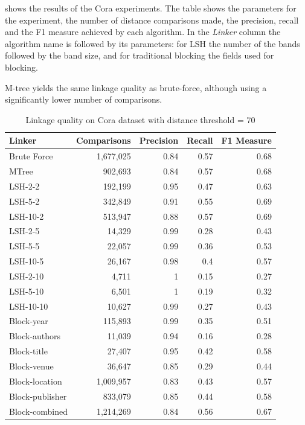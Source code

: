 \documentclass{llncs}
\begin{document}
 shows the results of the Cora
experiments. The table shows the parameters for the experiment, the
number of distance comparisons made, the precision, recall and the F1
measure achieved by each algorithm.  In the \emph{Linker} column the algorithm name is followed by its
parameters: for LSH the number of the bands followed by the band size, and for traditional blocking the fields used
for blocking.

M-tree yields the same linkage quality as brute-force, although using a significantly lower
number of comparisons.


\begin{table}[ht]
\centering
\begin{tabular}{l|r|r|r|r}
\parbox{0.2\textwidth}{\centering Linker} &
\parbox{0.2\textwidth}{\centering Comparisons} &
\parbox{0.17\textwidth}{\centering Precision} &
\parbox{0.17\textwidth}{\centering Recall} &
\parbox{0.17\textwidth}{\centering F1 Measure} \\ \hline \hline
Brute Force        & 1,677,025                 & 0.84      & 0.57   & 0.68       \\ \hline
MTree              &  902,693                  & 0.84      & 0.57   & 0.68       \\ \hline
LSH-2-2            &  192,199	& 0.95	& 0.47	& 0.63       \\
LSH-5-2            &  342,849	& 0.91	& 0.55	& 0.69       \\
LSH-10-2           &  513,947	& 0.88	& 0.57	& 0.69       \\
LSH-2-5            &  14,329	& 0.99	& 0.28	& 0.43      \\
LSH-5-5            &  22,057	& 0.99	& 0.36	& 0.53       \\
LSH-10-5           &  26,167	& 0.98	& 0.4	& 0.57      \\
LSH-2-10           &  4,711	& 1	& 0.15	& 0.27    \\
LSH-5-10           &  6,501	& 1	& 0.19	& 0.32      \\
LSH-10-10          & 10,627  	& 0.99	& 0.27& 	0.43       \\  \hline
Block-year         &  115,893                  & 0.99      & 0.35   & 0.51       \\
Block-authors      &   11,039                   & 0.94      & 0.16   & 0.28       \\
Block-title        &   27,407                   & 0.95      & 0.42   & 0.58       \\
Block-venue        &   36,647                   & 0.85      & 0.29   & 0.44       \\
Block-location     & 1,009,957                 & 0.83      & 0.43   & 0.57       \\
Block-publisher    &  833,079                  & 0.85      & 0.44   & 0.58       \\
Block-combined     & 1,214,269                 & 0.84      & 0.56   & 0.67       \\ \hline
\end{tabular}
\caption{Linkage quality on Cora dataset with distance threshold = 70
\label{comparison-of-results-cora}
}
\end{table}
\end{document}
